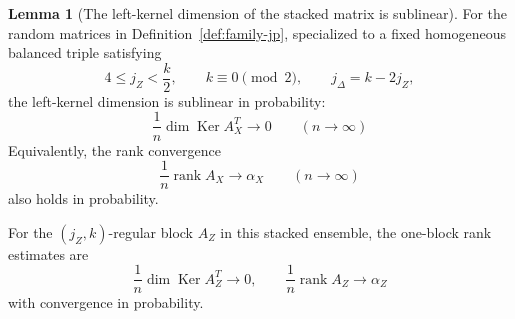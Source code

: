 \documentclass[11pt]{article}
\theoremstyle{definition}
\newtheorem{lemma}[theorem]{Lemma}
\newcommand{\rank}{\operatorname{rank}}
\newcommand{\Ker}{\operatorname{Ker}}
\begin{document}
\begin{lemma}[The left-kernel dimension of the stacked matrix is sublinear]\label{lem:A2-nullity-jp}
For the random matrices in Definition~\ref{def:family-jp}, specialized to a fixed homogeneous balanced triple satisfying
\begin{equation*}
4\le j_Z<\frac{k}{2},
\qquad
k\equiv0 \pmod 2,
\qquad
j_\Delta=k-2j_Z,
\end{equation*}
the left-kernel dimension is sublinear in probability:
\begin{equation*}
\frac{1}{n}\dim\Ker A_X^T \to 0
\qquad (n\to\infty)
\end{equation*}
Equivalently, the rank convergence
\begin{equation*}
\frac{1}{n}\rank A_X \to \alpha_X
\qquad (n\to\infty)
\end{equation*}
also holds in probability.

For the \((j_Z,k)\)-regular block \(A_Z\) in this stacked ensemble, the one-block rank estimates are
\begin{equation*}
\frac{1}{n}\dim\Ker A_Z^T\to 0,
\qquad
\frac{1}{n}\rank A_Z\to \alpha_Z
\end{equation*}
with convergence in probability.
\end{lemma}
\end{document}
